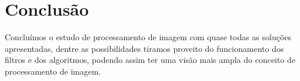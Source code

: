 \newpage
\section{Conclusão}
	Concluímos o estudo de processamento de imagem com quase todas as soluções apresentadas, dentre as possibilidades tiramos proveito do funcionamento dos filtros e dos algoritmos, podendo assim ter uma visão mais ampla do conceito de processamento de imagem.